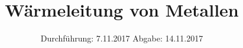 

\subject{v204}
\title{Wärmeleitung von Metallen}
\date{%
 Durchführung: 7.11.2017
  \hspace{3em}
  Abgabe: 14.11.2017
}



\maketitle
\thispagestyle{empty}
\tableofcontents
\newpage






\printbibliography{}


